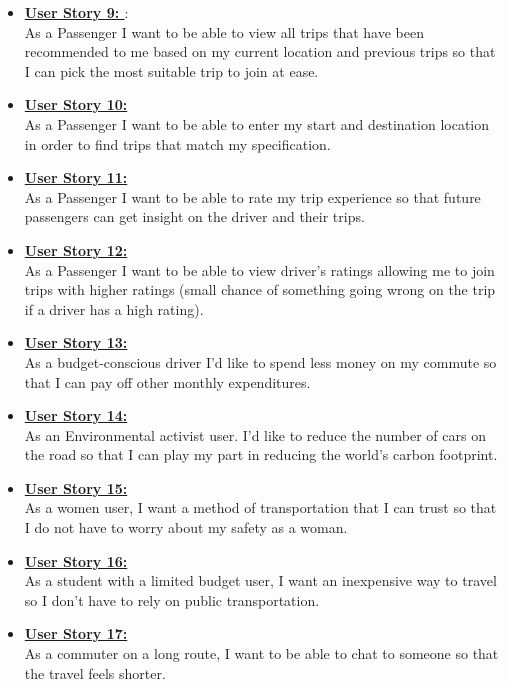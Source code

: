 \documentclass[hidelinks, 12pt, a4paper]{article}
\begin{document}
\begin{itemize}
        \item \textbf{\underline{User Story 9: }}: \\
       As a Passenger I want to be able to view all trips that have been recommended to me based on my current location and previous trips so that I can pick the most suitable trip to join at ease.
        \item \textbf{\underline{User Story 10: }} \\
       As a Passenger I want to be able to enter my start and destination location in order to find trips that match my specification.
        \item \textbf{\underline{User Story 11: }} \\
       As a Passenger I want to be able to rate my trip experience so that future passengers can get insight on the driver and their trips.
        \item \textbf{\underline{User Story 12: }} \\
        As a Passenger I want to be able to view driver's ratings allowing me to join trips with higher ratings (small chance of something going wrong on the trip if a driver has a high rating).
        \item \textbf{\underline{User Story 13: }} \\
       As a budget-conscious driver  I'd like to spend less money on my commute so that I can pay off other monthly expenditures. 
        \item \textbf{\underline{User Story 14: }} \\
        As an Environmental activist user. I'd like to reduce the number of cars on the road so that I can play my part in reducing the world’s carbon footprint.
        \item \textbf{\underline{User Story 15: }} \\
        As a women user, I want a method of transportation that I can trust so that I do not have to worry about my safety as a woman.
        \item \textbf{\underline{User Story 16: }} \\ 
        As a student with a limited budget user, I want an inexpensive way to travel so I don't have to rely on public transportation.
        \item \textbf{\underline{User Story 17: }} \\ 
        As a commuter on a long route, I want to be able to chat to someone so that the travel feels shorter.
        
        
    \end{itemize}
  
\end{document}
